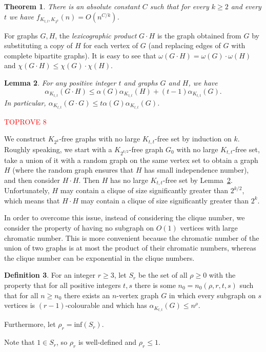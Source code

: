 \documentclass[11pt]{article}
\let\oldendproof\endproof
\renewenvironment{proof}[1][\proofname]{\oldproof[\bf #1]}{\oldendproof}
\theoremstyle{plain}
\newtheorem{theorem}{Theorem}[section]
\newtheorem{lemma}[theorem]{Lemma}
\theoremstyle{definition}
\newtheorem{definition}[theorem]{Definition}
\begin{document}
 \begin{theorem}\label{thm:Ktt vs Kr construction}
     There is an absolute constant $C$ such that for every $k\geq 2$ and every $t$ we have $f_{K_{t,t},K_{2^k}}(n)=O(n^{C/k})$.
 \end{theorem}

     
	For graphs $G,H$, the {\em lexicographic product} $G \cdot H$ is the graph obtained from $G$ by substituting a copy of $H$ for each vertex of $G$ (and replacing edges of $G$ with complete bipartite graphs). It is easy to see that $\omega(G \cdot H) = \omega(G) \cdot \omega(H)$ and $\chi(G \cdot H) \leq \chi(G) \cdot \chi(H)$.
	\begin{lemma}\label{lem:substitution 2 graphs}
		For any positive integer $t$ and graphs $G$ and $H$, we have 
        $$\alpha_{K_{t,t}}(G \cdot H) \leq \alpha(G)\alpha_{K_{t,t}}(H) + (t-1)\alpha_{K_{t,t}}(G).$$ 
        In particular, $\alpha_{K_{t,t}}(G\cdot G)\leq t\alpha(G)\alpha_{K_{t,t}}(G)$.
	\end{lemma}
	\begin{proof}\textcolor{red}{TOPROVE 8}\end{proof}
	\noindent

    We construct $K_{2^k}$-free graphs with no large $K_{t,t}$-free set by induction on $k$. Roughly speaking, we start with a $K_{2^{k/2}}$-free graph $G_0$ with no large $K_{t,t}$-free set,
     take a union of it with a random graph on the same vertex set to obtain a graph $H$ (where the random graph ensures that $H$ has small independence number), and then consider $H\cdot H$. Then $H$ has no large $K_{t,t}$-free set by Lemma~\ref{lem:substitution 2 graphs}. Unfortunately, $H$ may contain a clique of size significantly greater than $2^{k/2}$, which means that $H\cdot H$ may contain a clique of size significantly greater than $2^k$.

     
	In order to overcome this issue, instead of considering the clique number, we consider the property of having no subgraph on $O(1)$ vertices with large chromatic number. This is more convenient because the chromatic number of the union of two graphs is at most the product of their chromatic numbers, whereas the clique number can be exponential in the clique numbers.

 \begin{definition}
     For an integer $r\geq 3$, let $S_r$ be the set of all $\rho\geq 0$ with the property that for all positive integers $t,s$ there is some $n_0=n_0(\rho,r,t,s)$ such that for all $n\geq n_0$ there exists an $n$-vertex graph $G$ in which every subgraph on $s$ vertices is $(r-1)$-colourable and which has $\alpha_{K_{t,t}}(G)\leq n^{\rho}$.

     Furthermore, let $\rho_r=\textrm{inf}(S_r)$.
 \end{definition}
\noindent 
Note that $1\in S_r$, so $\rho_r$ is well-defined and $\rho_r\leq 1$.
\end{document}
